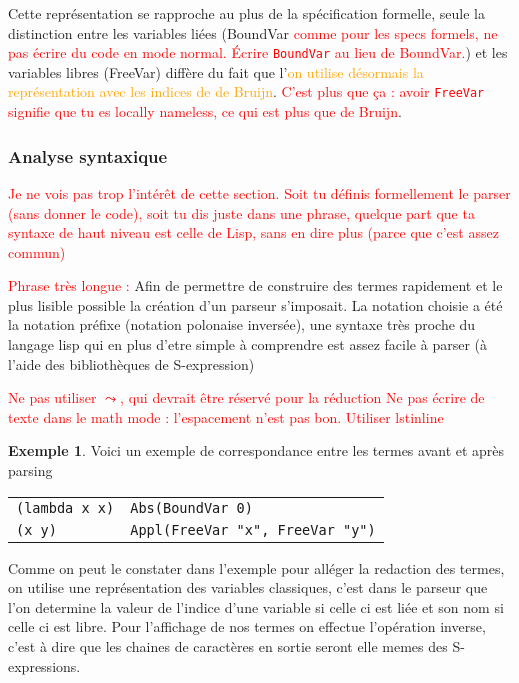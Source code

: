 \documentclass {article}
\theoremstyle{definition}
\newtheorem{example}{Exemple}
\theoremstyle{remark}
\newcommand{\todo}[1]{\textcolor{red}{#1}}
\newcommand{\attention}[1]{\textcolor{orange}{#1}}
\begin{document}
Cette représentation se rapproche au plus de la spécification
formelle, seule la distinction entre les variables liées (BoundVar
\todo{comme pour les specs formels, ne pas écrire du code en mode
  normal. Écrire \lstinline!BoundVar! au lieu de BoundVar.}) et les
variables libres (FreeVar) diffère du fait que l'\attention{on utilise
  désormais la représentation avec les indices de de
  Bruijn}. \todo{C'est plus que ça : avoir \lstinline!FreeVar!
  signifie que tu es locally nameless, ce qui est plus que de Bruijn}.


\subsubsection{Analyse syntaxique}

\todo{Je ne vois pas trop l'intérêt de cette section. Soit tu définis
  formellement le parser (sans donner le code), soit tu dis juste dans
  une phrase, quelque part que ta syntaxe de haut niveau est celle de
  Lisp, sans en dire plus (parce que c'est assez commun)}

\todo{Phrase très longue :}
Afin de permettre de construire des termes rapidement et le plus lisible 
possible la création d'un parseur s'imposait.
La notation choisie a été la notation préfixe (notation polonaise inversée),
une syntaxe très proche du langage lisp qui en plus d'etre simple à comprendre
est assez facile à parser (à l'aide des bibliothèques de S-expression)

\todo{Ne pas utiliser $\leadsto$, qui devrait être réservé pour la réduction}
\todo{Ne pas écrire de texte dans le math mode : l'espacement n'est pas bon. Utiliser lstinline}
\begin{example}
  Voici un exemple de correspondance entre les termes avant et après parsing

  \begin{tabular}{ll}
    \lstinline!(lambda x x)! & \lstinline!Abs(BoundVar 0)! \\
    \lstinline!(x y)! & \lstinline!Appl(FreeVar "x", FreeVar "y")!
  \end{tabular}
\end{example}

Comme on peut le constater dans l'exemple pour alléger la redaction des termes,
on utilise une représentation des variables classiques, c'est dans le parseur que 
l'on determine la valeur de l'indice d'une variable si celle ci est liée et son 
nom si celle ci est libre.
Pour l'affichage de nos termes on effectue l'opération inverse, c'est à dire que
les chaines de caractères en sortie seront elle memes des S-expressions.
\end{document}
